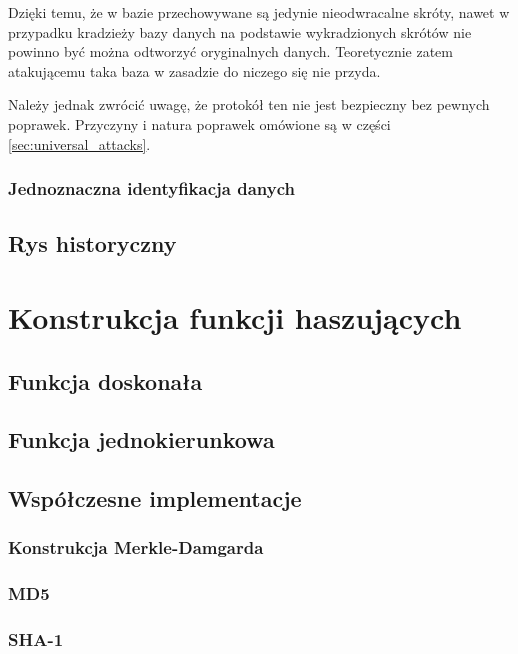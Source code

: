 \documentclass[12pt,a4paper,twoside]{article}
\begin{document}
Dzięki temu, że w bazie przechowywane są jedynie nieodwracalne skróty, nawet w
przypadku kradzieży bazy danych na podstawie wykradzionych skrótów nie powinno
być można odtworzyć oryginalnych danych. Teoretycznie zatem atakującemu taka
baza w zasadzie do niczego się nie przyda.

Należy jednak zwrócić uwagę, że protokół ten nie jest bezpieczny bez pewnych
poprawek. Przyczyny i natura poprawek omówione są w części
\ref{sec:universal_attacks}.

\subsubsection{Jednoznaczna identyfikacja danych}



\newpage

\subsection{Rys historyczny}

\section{Konstrukcja funkcji haszujących}

\subsection{Funkcja doskonała}

\subsection{Funkcja jednokierunkowa}

\subsection{Współczesne implementacje}

\subsubsection{Konstrukcja Merkle-Damgarda}

\subsubsection{MD5}

\subsubsection{SHA-1}
\end{document}
